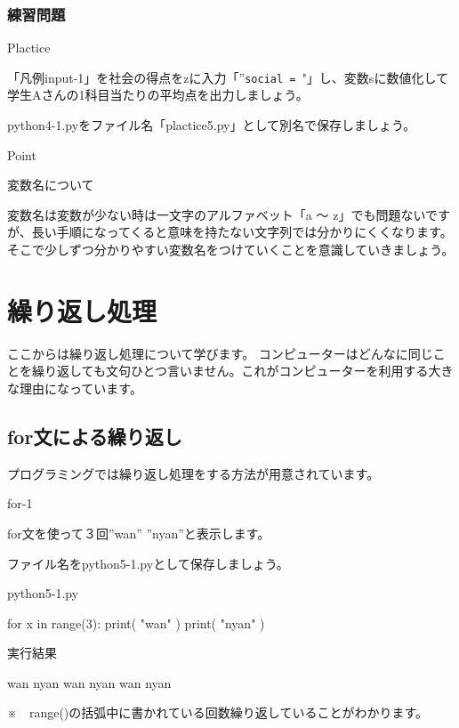 \documentclass[11pt,a4paper,dvipdfmx,titlepage]{jsreport}
\begin{document}
\subsubsection{練習問題}
\begin{plabox}{Plactice}

「凡例input-1」を社会の得点をzに入力「”{\tt social = }"」し、変数sに数値化して学生Aさんの1科目当たりの平均点を出力しましょう。

python4-1.pyをファイル名「plactice5.py」として別名で保存しましょう。

\end{plabox}

\begin{hipoint}{Point}

変数名について

変数名は変数が少ない時は一文字のアルファベット「a ～ z」でも問題ないですが、長い手順になってくると意味を持たない文字列では分かりにくくなります。
そこで少しずつ分かりやすい変数名をつけていくことを意識していきましょう。
\end{hipoint}
\newpage
\section{繰り返し処理}
ここからは繰り返し処理について学びます。
コンピューターはどんなに同じことを繰り返しても文句ひとつ言いません。これがコンピューターを利用する大きな理由になっています。

\subsection{for文による繰り返し}
プログラミングでは繰り返し処理をする方法が用意されています。



\begin{pabox}{for-1}

for文を使って３回”wan” ”nyan”と表示します。

ファイル名をpython5-1.pyとして保存しましょう。
\begin{legbox}{python5-1.py}
\begin{listing}{1}
for x in range(3):
    print( "wan" )
    print( "nyan" )
\end{listing}
実行結果
\begin{listing}{1}
wan
nyan
wan
nyan
wan
nyan
\end{listing}
\end{legbox}


※　range()の括弧中に書かれている回数繰り返していることがわかります。
\end{pabox}
\end{document}
